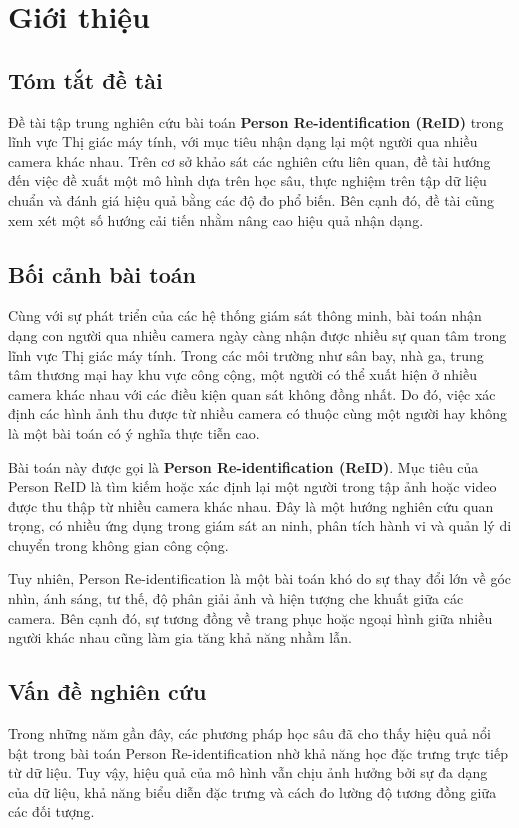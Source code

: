 \section{Giới thiệu}

\subsection{Tóm tắt đề tài}
Đề tài tập trung nghiên cứu bài toán \textbf{Person Re-identification (ReID)} trong lĩnh vực Thị giác máy tính, với mục tiêu nhận dạng lại một người qua nhiều camera khác nhau. Trên cơ sở khảo sát các nghiên cứu liên quan, đề tài hướng đến việc đề xuất một mô hình dựa trên học sâu, thực nghiệm trên tập dữ liệu chuẩn và đánh giá hiệu quả bằng các độ đo phổ biến. Bên cạnh đó, đề tài cũng xem xét một số hướng cải tiến nhằm nâng cao hiệu quả nhận dạng.

\subsection{Bối cảnh bài toán}
Cùng với sự phát triển của các hệ thống giám sát thông minh, bài toán nhận dạng con người qua nhiều camera ngày càng nhận được nhiều sự quan tâm trong lĩnh vực Thị giác máy tính. Trong các môi trường như sân bay, nhà ga, trung tâm thương mại hay khu vực công cộng, một người có thể xuất hiện ở nhiều camera khác nhau với các điều kiện quan sát không đồng nhất. Do đó, việc xác định các hình ảnh thu được từ nhiều camera có thuộc cùng một người hay không là một bài toán có ý nghĩa thực tiễn cao.

Bài toán này được gọi là \textbf{Person Re-identification (ReID)}. Mục tiêu của Person ReID là tìm kiếm hoặc xác định lại một người trong tập ảnh hoặc video được thu thập từ nhiều camera khác nhau. Đây là một hướng nghiên cứu quan trọng, có nhiều ứng dụng trong giám sát an ninh, phân tích hành vi và quản lý di chuyển trong không gian công cộng.

Tuy nhiên, Person Re-identification là một bài toán khó do sự thay đổi lớn về góc nhìn, ánh sáng, tư thế, độ phân giải ảnh và hiện tượng che khuất giữa các camera. Bên cạnh đó, sự tương đồng về trang phục hoặc ngoại hình giữa nhiều người khác nhau cũng làm gia tăng khả năng nhầm lẫn.

\subsection{Vấn đề nghiên cứu}
Trong những năm gần đây, các phương pháp học sâu đã cho thấy hiệu quả nổi bật trong bài toán Person Re-identification nhờ khả năng học đặc trưng trực tiếp từ dữ liệu. Tuy vậy, hiệu quả của mô hình vẫn chịu ảnh hưởng bởi sự đa dạng của dữ liệu, khả năng biểu diễn đặc trưng và cách đo lường độ tương đồng giữa các đối tượng.

